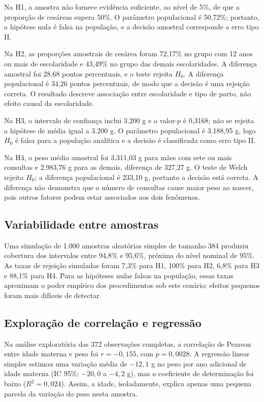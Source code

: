 \documentclass[12pt,a4paper]{article}
\begin{document}
Na H1, a amostra não fornece evidência suficiente, ao nível de 5\%, de que a proporção de cesáreas supera 50\%. O parâmetro populacional é 50,72\%; portanto, a hipótese nula é falsa na população, e a decisão amostral corresponde a erro tipo II.

Na H2, as proporções amostrais de cesárea foram 72,17\% no grupo com 12 anos ou mais de escolaridade e 43,49\% no grupo das demais escolaridades. A diferença amostral foi 28,68 pontos percentuais, e o teste rejeita \(H_0\). A diferença populacional é 34,26 pontos percentuais, de modo que a decisão é uma rejeição correta. O resultado descreve associação entre escolaridade e tipo de parto, não efeito causal da escolaridade.

Na H3, o intervalo de confiança inclui 3.200 g e o valor-\(p\) é 0,3168; não se rejeita a hipótese de média igual a 3.200 g. O parâmetro populacional é 3.188,95 g, logo \(H_0\) é falsa para a população analítica e a decisão é classificada como erro tipo II.

Na H4, o peso médio amostral foi 3.311,03 g para mães com sete ou mais consultas e 2.983,76 g para as demais, diferença de 327,27 g. O teste de Welch rejeita \(H_0\); a diferença populacional é 233,10 g, portanto a decisão está correta. A diferença não demonstra que o número de consultas cause maior peso ao nascer, pois outros fatores podem estar associados aos dois fenômenos.

\subsection{Variabilidade entre amostras}

Uma simulação de 1.000 amostras aleatórias simples de tamanho 384 produziu cobertura dos intervalos entre 94,8\% e 95,6\%, próxima do nível nominal de 95\%. As taxas de rejeição simuladas foram 7,3\% para H1, 100\% para H2, 6,8\% para H3 e 88,1\% para H4. Para as hipóteses nulas falsas na população, essas taxas aproximam o poder empírico dos procedimentos sob este cenário; efeitos pequenos foram mais difíceis de detectar.

\subsection{Exploração de correlação e regressão}

Na análise exploratória das 372 observações completas, a correlação de Pearson entre idade materna e peso foi \(r=-0{,}155\), com \(p=0{,}0028\). A regressão linear simples estimou uma variação média de \(-12{,}1\) g no peso por ano adicional de idade materna (IC 95\%: \(-20{,}0\) a \(-4{,}2\) g), mas o coeficiente de determinação foi baixo (\(R^2=0{,}024\)). Assim, a idade, isoladamente, explica apenas uma pequena parcela da variação do peso nesta amostra.
\end{document}
